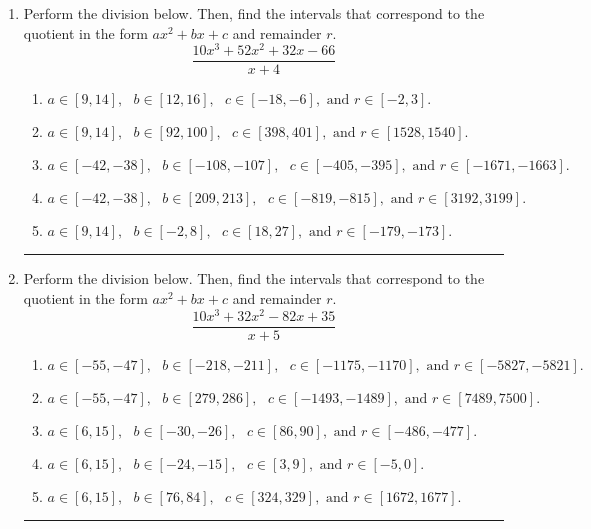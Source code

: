 \documentclass[14pt]{extbook}
\newcommand{\litem}[1]{\item#1\hspace*{-1cm}\rule{\textwidth}{0.4pt}}
\begin{document}
\begin{enumerate}
{\begin{enumerate}[label=\Alph*.]
\end{enumerate} }
\litem{
Perform the division below. Then, find the intervals that correspond to the quotient in the form $ax^2+bx+c$ and remainder $r$.\[ \frac{10x^{3} +52 x^{2} +32 x -66}{x + 4} \]\begin{enumerate}[label=\Alph*.]
\item \( a \in [9, 14], \text{   } b \in [12, 16], \text{   } c \in [-18, -6], \text{   and   } r \in [-2, 3]. \)
\item \( a \in [9, 14], \text{   } b \in [92, 100], \text{   } c \in [398, 401], \text{   and   } r \in [1528, 1540]. \)
\item \( a \in [-42, -38], \text{   } b \in [-108, -107], \text{   } c \in [-405, -395], \text{   and   } r \in [-1671, -1663]. \)
\item \( a \in [-42, -38], \text{   } b \in [209, 213], \text{   } c \in [-819, -815], \text{   and   } r \in [3192, 3199]. \)
\item \( a \in [9, 14], \text{   } b \in [-2, 8], \text{   } c \in [18, 27], \text{   and   } r \in [-179, -173]. \)

\end{enumerate} }
\litem{
Perform the division below. Then, find the intervals that correspond to the quotient in the form $ax^2+bx+c$ and remainder $r$.\[ \frac{10x^{3} +32 x^{2} -82 x + 35}{x + 5} \]\begin{enumerate}[label=\Alph*.]
\item \( a \in [-55, -47], \text{   } b \in [-218, -211], \text{   } c \in [-1175, -1170], \text{   and   } r \in [-5827, -5821]. \)
\item \( a \in [-55, -47], \text{   } b \in [279, 286], \text{   } c \in [-1493, -1489], \text{   and   } r \in [7489, 7500]. \)
\item \( a \in [6, 15], \text{   } b \in [-30, -26], \text{   } c \in [86, 90], \text{   and   } r \in [-486, -477]. \)
\item \( a \in [6, 15], \text{   } b \in [-24, -15], \text{   } c \in [3, 9], \text{   and   } r \in [-5, 0]. \)
\item \( a \in [6, 15], \text{   } b \in [76, 84], \text{   } c \in [324, 329], \text{   and   } r \in [1672, 1677]. \)


\end{enumerate}}
\end{enumerate}
\end{document}
